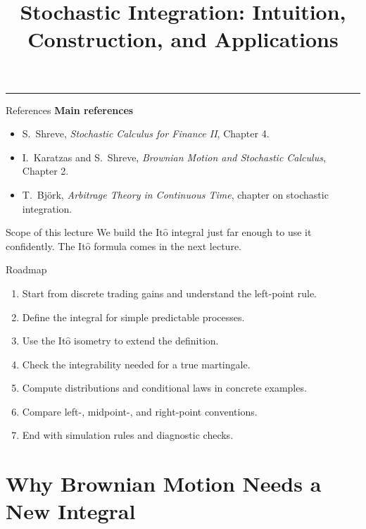 \documentclass[10pt,aspectratio=169]{beamer}
\title{Stochastic Integration: Intuition, Construction, and Applications}
\author{}
\date{}
\newcommand{\Ito}{\mathrm{It\hat{o}}}
\begin{document}
\begin{frame}[plain]
  \vfill
  {\inserttitle\par}
  \medskip
  {\color{BootcampBlueDark}\rule{0.95\textwidth}{0.8pt}}
  \vfill
\end{frame}

\begin{frame}{References}
\footnotesize
\textbf{Main references}
\begin{itemize}\setlength{\itemsep}{0.55em}
  \item S.~Shreve, \emph{Stochastic Calculus for Finance II}, Chapter 4.
  \item I.~Karatzas and S.~Shreve, \emph{Brownian Motion and Stochastic Calculus}, Chapter 2.
  \item T.~Bj\"ork, \emph{Arbitrage Theory in Continuous Time}, chapter on stochastic integration.
\end{itemize}
\begin{block}{Scope of this lecture}
We build the \(\Ito\) integral just far enough to use it confidently. The \(\Ito\) formula comes in the next lecture.
\end{block}
\end{frame}

\begin{frame}{Roadmap}
\begin{enumerate}\setlength{\itemsep}{0.45em}
  \item Start from discrete trading gains and understand the left-point rule.
  \item Define the integral for simple predictable processes.
  \item Use the \(\Ito\) isometry to extend the definition.
  \item Check the integrability needed for a true martingale.
  \item Compute distributions and conditional laws in concrete examples.
  \item Compare left-, midpoint-, and right-point conventions.
  \item End with simulation rules and diagnostic checks.
\end{enumerate}
\end{frame}

\section{Why Brownian Motion Needs a New Integral}
\end{document}

